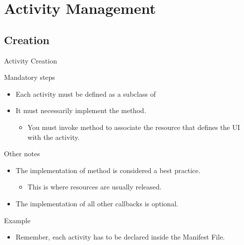 \documentclass{beamer}
\begin{document}
\section{Activity Management}
  \subsection{Creation}

  \begin{frame}{Activity Creation}
    \begin{block}{Mandatory steps}
      \begin{itemize}
        \item Each activity must be defined as a subclass of 
        \item It must necessarily implement the  method.
        \begin{itemize}
          \item You must invoke method  to associate the resource that defines the UI with the activity.
        \end{itemize}
      \end{itemize}
    \end{block}

    \begin{block}{Other notes}
      \begin{itemize}
        \item The implementation of method  is considered a best practice.
        \begin{itemize}
          \item This is where resources are usually released.
        \end{itemize}
        \item The implementation of all other callbacks is optional.
      \end{itemize}
    \end{block}
    
    \begin{exampleblock}{Example}
      
    \end{exampleblock}

    \begin{itemize}
      \item Remember, each activity has to be declared inside the Manifest File.
    \end{itemize}
  \end{frame}
\end{document}
